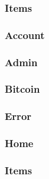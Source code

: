 \documentclass[11pt]{article} %
\begin{document}
\subsubsection{Items}
\subsubsection{Account}
\subsubsection{Admin}
\subsubsection{Bitcoin}
\subsubsection{Error}
\subsubsection{Home}
\subsubsection{Items}
\end{document}
